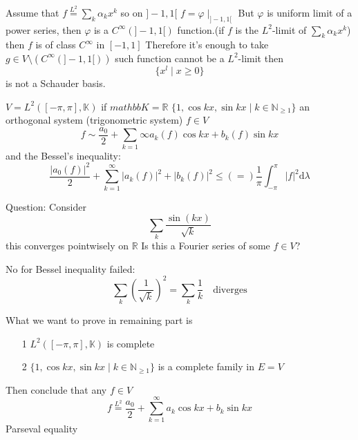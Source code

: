 \documentclass{book}
\newcommand{\abs}[1]{\left\lvert #1 \right\rvert}
\newcommand{\leftbracket}{[}
\newcommand{\rightbracket}{]}
\begin{document}
Assume that $f\stackrel{L^2}{=}\sum\limits_k\alpha_kx^k$ so on $\rightbracket-1,1\leftbracket$ $f=\varphi\mid_{\rightbracket-1,1\leftbracket}$
But $\varphi$ is uniform limit of a power series, then $\varphi$ is a $C^\infty(\rightbracket-1,1\leftbracket)$ function.(if $f$ is the $L^2$-limit of $\sum\limits_k\alpha_kx^k$) then $f$ is of class $C^\infty$ in $\leftbracket-1,1\rightbracket$ Therefore it's enough to take $g\in V\setminus(C^\infty(\rightbracket-1,1\leftbracket))$ such function cannot be a $L^2$-limit then$$\{x^l\mid x\geq 0\}$$ is not a Schauder basis.

$V=L^2([-\pi,\pi],\mathbb{K})$ if $mathbb{K}=\mathbb{R}$ $\{1,\cos kx,\sin kx\mid k\in \mathbb{N}_{\geq 1}\}$ an orthogonal system (trigonometric system) $f\in V$$$f\sim\frac{a_0}{2}+\sum\limits_{k=1}{\infty}a_k(f)\cos kx+b_k(f)\sin kx$$
and the Bessel's inequality:$$\frac{\abs{a_0(f)}^2}2+\sum\limits_{k=1}^\infty\abs{a_k(f)}^2+\abs{b_k(f)}^2\leq(=)\frac{1}{\pi}\int_{-\pi}^\pi\abs{f}^2\text{d}\lambda$$

Question: Consider $$\sum\limits_k\frac{\sin(kx)}{\sqrt{k}}$$this converges pointwisely on $\mathbb{R}$ Is this a Fourier series of some $f\in V$?

No for Bessel inequality failed:$$\sum\limits_k(\frac{1}{\sqrt{k}})^2=\sum\limits_k\frac{1}k\quad\text{diverges}$$

What we want to prove in remaining part is \begin{itemize}
    \item [1]$L^2([-\pi,\pi],\mathbb{K})$ is complete
    \item[2]$\{1,\cos kx,\sin kx\mid k\in \mathbb{N}_{\geq 1}\}$ is a complete family in $E=V$
\end{itemize}
Then conclude that any $f\in V$ $$f\stackrel{L^2}=\frac{a_0}{2}+\sum\limits_{k=1}^\infty a_k\cos kx+b_k\sin kx$$
Parseval equality
\end{document}
